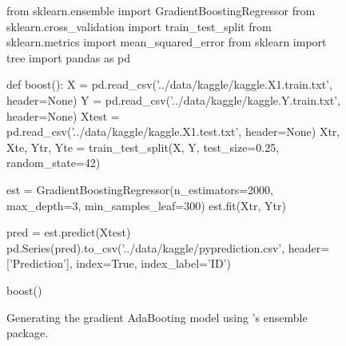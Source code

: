 \documentclass[a4paper, 11pt]{article}
\begin{document}
\begin{enumerate}[(a)]
\begin{figure}
\begin{python}[caption={SVM Primal Form},label={lst:pythonsktree}]
from sklearn.ensemble import GradientBoostingRegressor
from sklearn.cross_validation import train_test_split
from sklearn.metrics import mean_squared_error
from sklearn import tree
import pandas as pd

def boost():
    X = pd.read_csv('../data/kaggle/kaggle.X1.train.txt', header=None)
    Y = pd.read_csv('../data/kaggle/kaggle.Y.train.txt', header=None)
    Xtest = pd.read_csv('../data/kaggle/kaggle.X1.test.txt', header=None)
    Xtr, Xte, Ytr, Yte = train_test_split(X, Y, test_size=0.25, random_state=42)

    est = GradientBoostingRegressor(n_estimators=2000, max_depth=3, min_samples_leaf=300)
    est.fit(Xtr, Ytr)

    pred = est.predict(Xtest)
    pd.Series(pred).to_csv('../data/kaggle/pyprediction.csv', header=['Prediction'], index=True, index_label='ID')
    
boost()
\end{python}
\caption[]{Generating the gradient AdaBooting model using 's ensemble package.}
\label{fig:boosting1}
\end{figure}
\end{enumerate}
\end{document}
